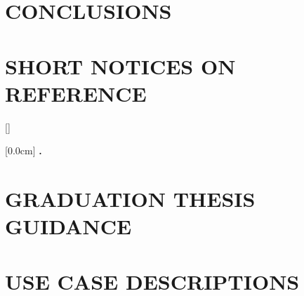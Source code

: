 \documentclass[a4paper,13pt,3p,twoside]{report}
\theoremstyle{definition}
\begin{document}
\newpage
\chapter{CONCLUSIONS}


\newpage
\chapter*{SHORT NOTICES ON REFERENCE} %
\label{chapter:reference}


\newpage
\renewcommand\bibname{REFERENCE}
\printbibliography
{}

\appendixpage
\appendix
\addappheadtotoc

[]
\titlespacing*{\chapter}{0pt}{-20pt}{20pt}

    [0.0cm]             %
    {\bfseries\vspace{0.3cm}}                  %
    {{\bfseries{\scshape} \thecontentslabel.\ }} %
    {}         %
    {\contentspage} 
    
\chapter{GRADUATION THESIS GUIDANCE}


\newpage
\chapter{USE CASE DESCRIPTIONS}

\end{document}

